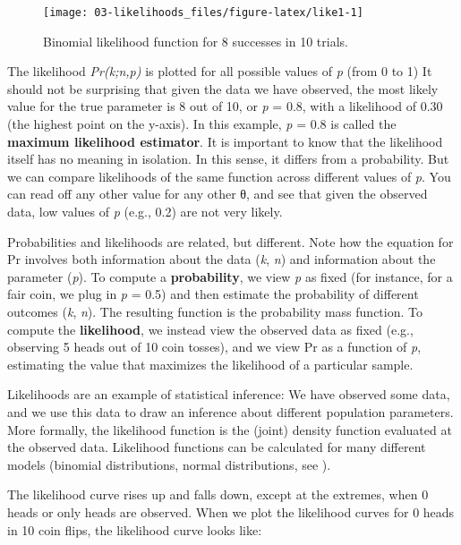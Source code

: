 \documentclass[
]{krantz}
\begin{document}
\begin{figure}

{\centering \texttt{[image: 03-likelihoods\_files/figure-latex/like1-1]} 

}

\caption{Binomial likelihood function for 8 successes in 10 trials.}\label{fig:like1}
\end{figure}

The likelihood \emph{Pr(k;n,p)} is plotted for all possible values of \emph{p} (from 0 to 1) It should not be surprising that given the data we have observed, the most likely value for the true parameter is 8 out of 10, or \emph{p} = 0.8, with a likelihood of 0.30 (the highest point on the y-axis). In this example, \emph{p} = 0.8 is called the \textbf{maximum likelihood estimator}. It is important to know that the likelihood itself has no meaning in isolation. In this sense, it differs from a probability. But we can compare likelihoods of the same function across different values of \emph{p}. You can read off any other value for any other θ, and see that given the observed data, low values of \emph{p} (e.g., 0.2) are not very likely.

Probabilities and likelihoods are related, but different. Note how the equation for Pr involves both information about the data (\emph{k}, \emph{n}) and information about the parameter (\emph{p}). To compute a \textbf{probability}, we view \emph{p} as fixed (for instance, for a fair coin, we plug in \emph{p} = 0.5) and then estimate the probability of different outcomes (\emph{k}, \emph{n}). The resulting function is the probability mass function. To compute the \textbf{likelihood}, we instead view the observed data as fixed (e.g., observing 5 heads out of 10 coin tosses), and we view Pr as a function of \emph{p}, estimating the value that maximizes the likelihood of a particular sample.

Likelihoods are an example of statistical inference: We have observed some data, and we use this data to draw an inference about different population parameters. More formally, the likelihood function is the (joint) density function evaluated at the observed data. Likelihood functions can be calculated for many different models (binomial distributions, normal distributions, see \citet{millar_maximum_2011}).

The likelihood curve rises up and falls down, except at the extremes, when 0 heads or only heads are observed. When we plot the likelihood curves for 0 heads in 10 coin flips, the likelihood curve looks like:
\end{document}
